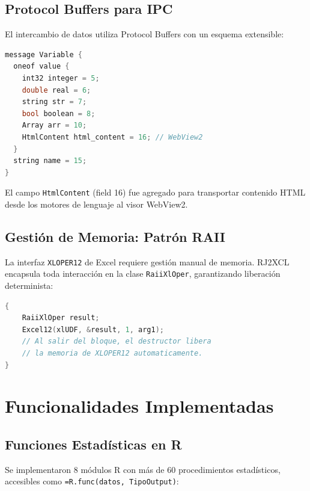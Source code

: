 \documentclass[12pt, a4paper]{report}
\begin{document}
\section{Protocol Buffers para IPC}

El intercambio de datos utiliza Protocol Buffers con un esquema extensible:

\begin{lstlisting}[language=C++, caption={Esquema Protobuf simplificado}]
message Variable {
  oneof value {
    int32 integer = 5;
    double real = 6;
    string str = 7;
    bool boolean = 8;
    Array arr = 10;
    HtmlContent html_content = 16; // WebView2
  }
  string name = 15;
}
\end{lstlisting}

El campo \texttt{HtmlContent} (field 16) fue agregado para transportar contenido HTML desde los motores de lenguaje al visor WebView2.

\section{Gestión de Memoria: Patrón RAII}

La interfaz \texttt{XLOPER12} de Excel requiere gestión manual de memoria. RJ2XCL encapsula toda interacción en la clase \texttt{RaiiXlOper}, garantizando liberación determinista:

\begin{lstlisting}[language=C++, caption={Patrón RAII para XLOPER12}]
{
    RaiiXlOper result;
    Excel12(xlUDF, &result, 1, arg1);
    // Al salir del bloque, el destructor libera
    // la memoria de XLOPER12 automaticamente.
}
\end{lstlisting}

\chapter{Funcionalidades Implementadas}

\section{Funciones Estadísticas en R}

Se implementaron 8 módulos R con más de 60 procedimientos estadísticos, accesibles como \texttt{=R.func(datos, TipoOutput)}:
\end{document}
